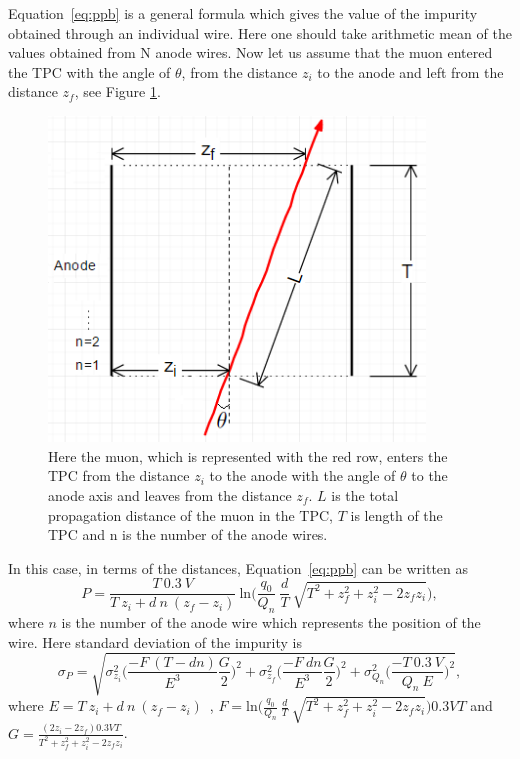 \documentclass[a4paper]{article}\linespread{1.4}
\begin{document}
Equation~\ref{eq:ppb} is a general formula which gives the value of the impurity obtained through an individual wire. Here one should take arithmetic mean of the values obtained from N anode wires.
Now let us assume that the muon entered the TPC with the angle of $\theta$, from the distance $z_{i}$ to the anode and left from the distance $z_{f}$, see Figure \ref{fig:sich}.
\begin{figure}[] \centering \includegraphics[width=100mm,scale=1.0]{figures/sich.png} \caption{Here the muon, which is represented with the red row, enters the TPC from the distance $z_{i}$ to the anode with the angle of $\theta$ to the anode axis and leaves from the distance $z_{f}$.  $L$ is the total propagation distance of the muon in the TPC, $T$ is length of the TPC and n is the number of the anode wires.} \label{fig:sich} \end{figure}  
In this case, in terms of the distances, Equation~\ref{eq:ppb} can be written as
\begin{equation} P= \frac{T~0.3~V}{T~z_{i}+d~n~(z_{f}-z_{i})}~\mathrm{ln}\Big(\frac{q_{0}}{Q_{n}}~\frac{d}{T}~\sqrt{T^{2}+z_{f}^{2}+z_{i}^{2}-2z_{f}z_{i}}\Big),\label{eq:ppbs}\end{equation} 
where $n$ is the number of the anode wire which represents the position of the wire. Here standard deviation of the impurity is
\begin{equation} \sigma_{P}= \sqrt{\sigma_{z_{i}}^2 \Big( \frac{-F~(T-dn)}{E^3} \frac{G}{2} \Big)^2 + \sigma_{z_{f}}^2 \Big( \frac{-F~dn}{E^3} \frac{G}{2} \Big)^2 + \sigma_{Q_{n}}^2 \Big( \frac{-T\ 0.3\ V}{Q_{n}\ E} \Big)^2}, \label{eq:432}\end{equation} 
where $E=T~z_{i}+d~n~(z_{f}-z_{i})$~, $F=\mathrm{ln}\Big(\frac{q_{0}}{Q_{n}}~\frac{d}{T}~\sqrt{T^{2}+z_{f}^{2}+z_{i}^{2}-2z_{f}z_{i}}\Big) 0.3 V T$ and $G=\frac{(2z_{i}-2z_{f})0.3 V T}{T^{2}+z_{f}^{2}+z_{i}^{2}-2z_{f}z_{i}}$.
\end{document}
